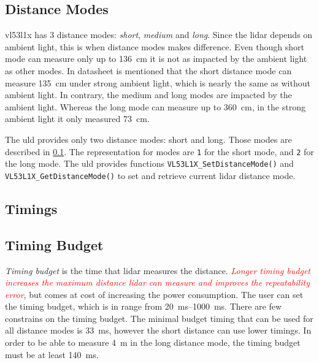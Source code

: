 \documentclass[
  digital,     %
  oneside,     %
  nosansbold,  %
  nocolorbold, %
  lof,         %
  lot,         %
]{fithesis4}
\newcommand{\TODO}[1]{\textcolor{red}{\textit{#1}}}
\begin{document}
\subsection{ Distance Modes } \label{distance-modes}

\gls{vl53l1x} has 3 distance modes: \emph{short}, \emph{medium} and \emph{long}. Since the \acrshort{lidar} depends on ambient light, this is when distance modes makes difference. Even though short mode can measure only up to \qty{136}{\centi\metre} it is not as impacted by the ambient light as other modes. In datasheet \cite{vl53l1x} is mentioned that the short distance mode can measure \qty{135}{\centi\metre} under strong ambient light, which is nearly the same as without ambient light. In contrary, the medium and long modes are impacted by the ambient light. Whereas the long mode can measure up to \qty{360}{\centi\metre}, in the strong ambient light it only measured \qty{73}{\centi\metre}.

The \acrshort{uld} provides only two distance modes: short and long. Those modes are described in \ref{distance-modes}. The representation for modes are \lstinline|1| for the short mode, and \lstinline|2| for the long mode. The \acrshort{uld} provides functions \lstinline|VL53L1X_SetDistanceMode()| and \lstinline|VL53L1X_GetDistanceMode()| to set and retrieve current \acrshort{lidar} distance mode.

\subsection{ Timings }


\subsection{ Timing Budget } \label{TB}

\emph{Timing budget} is the time that \acrshort{lidar} measures the distance. \TODO{ Longer timing budget increases the maximum distance \acrshort{lidar} can measure and improves the repeatability error}, but comes at cost of increasing the power consumption. The user can set the timing budget, which is in range from \qtyrange{20}{1000}{\milli\second}. There are few constrains on the timing budget. The minimal budget timing that can be used for all distance modes is \qty{33}{\milli\second}, however the short distance can use lower timings. In order to be able to measure \qty{4}{\metre} in the long distance mode, the timing budget must be at least \qty{140}{\milli\second}.
\end{document}
